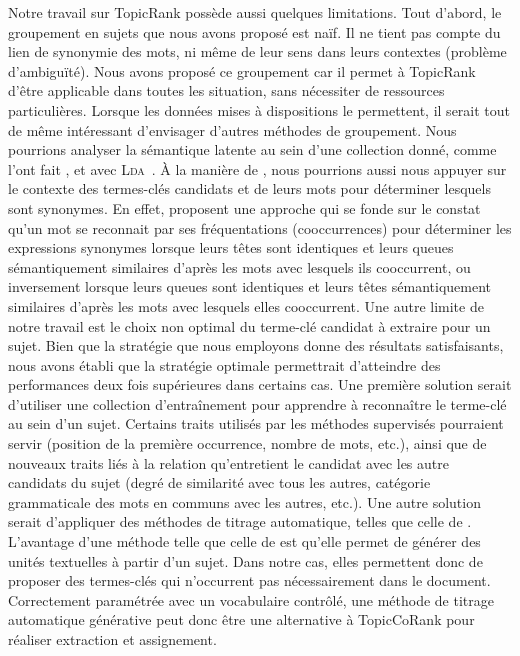     Notre travail sur TopicRank possède aussi quelques limitations. Tout
    d'abord, le groupement en sujets que nous avons proposé est naïf. Il ne
    tient pas compte du lien de synonymie des mots, ni même de leur sens dans
    leurs contextes (problème d'ambiguïté). Nous avons proposé ce groupement car
    il permet à TopicRank d'être applicable dans toutes les situation, sans
    nécessiter de ressources particulières. Lorsque les données mises à
    dispositions le permettent, il serait tout de même intéressant d'envisager
    d'autres méthodes de groupement. Nous pourrions analyser la sémantique
    latente au sein d'une collection donné, comme l'ont fait
    , 
    et  avec
    \textsc{Lda}~\cite{blei2003lda}. À la manière de
    , nous pourrions aussi nous appuyer sur
    le contexte des termes-clés candidats et de leurs mots pour déterminer
    lesquels sont synonymes. En effet, 
    proposent une approche qui se fonde sur le constat qu'un mot se reconnait
    par ses fréquentations (cooccurrences) pour déterminer les expressions
    synonymes lorsque leurs têtes sont identiques et leurs queues sémantiquement
    similaires d'après les mots avec lesquels ils cooccurrent, ou inversement
    lorsque leurs queues sont identiques et leurs têtes sémantiquement
    similaires d'après les mots avec lesquels elles cooccurrent. Une autre
    limite de notre travail est le choix non optimal du terme-clé candidat à
    extraire pour un sujet. Bien que la stratégie que nous employons donne des
    résultats satisfaisants, nous avons établi que la stratégie optimale
    permettrait d'atteindre des performances deux fois supérieures dans certains
    cas. Une première solution serait d'utiliser une collection d'entraînement
    pour apprendre à reconnaître le terme-clé au sein d'un sujet. Certains
    traits utilisés par les méthodes supervisés pourraient servir (position de
    la première occurrence, nombre de mots, etc.), ainsi que de nouveaux traits
    liés à la relation qu'entretient le candidat avec les autre candidats du
    sujet (degré de similarité avec tous les autres, catégorie grammaticale des
    mots en communs avec les autres, etc.). Une autre solution serait
    d'appliquer des méthodes de titrage automatique, telles que celle de
    . L'avantage d'une méthode telle que celle de
     est qu'elle permet de générer des unités
    textuelles à partir d'un sujet. Dans notre cas, elles permettent donc de
    proposer des termes-clés qui n'occurrent pas nécessairement dans le
    document. Correctement paramétrée avec un vocabulaire contrôlé, une méthode
    de titrage automatique générative peut donc être une alternative à
    TopicCoRank pour réaliser extraction et assignement.

